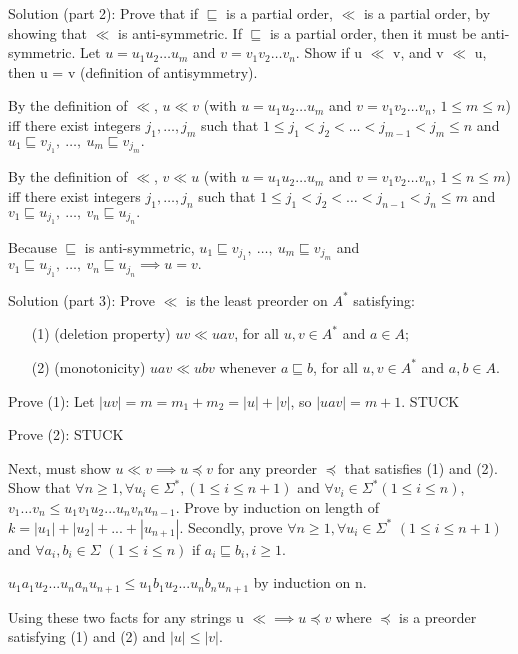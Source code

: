 \documentclass[12pt]{article}
\begin{document}
\medskip
\medskip

Solution (part 2): Prove that if $\sqsubseteq $ is a partial order, $\ll$ is a partial order, by showing that $\ll$ is anti-symmetric. If $\sqsubseteq $ is a
partial order, then it must be anti-symmetric. Let $u=u_{1}u_{2}\ldots u_{m}$ and
$v=v_{1}v_{2}\ldots v_{n}$. Show if u $\ll$ v, and v $\ll$ u, then u = v (definition of antisymmetry).
\medskip

By the definition of $\ll$, $u \ll v$ (with $u=u_{1}u_{2}\ldots u_{m}$ and
$v=v_{1}v_{2}\ldots v_{n}$, $1\leq m\leq n$) iff there exist integers $j_{1},\ldots,j_{m}$ such that
$1\leq j_{1} < j_{2} < \ldots < j_{m-1} < j_{m} \leq n$ and
$u_{1} \sqsubseteq v_{j_{1}},\ \ldots,\ u_{m} \sqsubseteq v_{j_{m}}.$

By the definition of $\ll$, $v \ll u$ (with $u=u_{1}u_{2}\ldots u_{m}$ and
$v=v_{1}v_{2}\ldots v_{n}$, $1\leq n\leq m$) iff there exist integers $j_{1},\ldots,j_{n}$ such that
$1\leq j_{1} < j_{2} < \ldots < j_{n-1} < j_{n} \leq m$ and
$v_{1} \sqsubseteq u_{j_{1}},\ \ldots,\ v_{n} \sqsubseteq u_{j_{n}}.$

\medskip

Because $\sqsubseteq $ is anti-symmetric, $u_{1} \sqsubseteq v_{j_{1}},\ \ldots,\ u_{m} \sqsubseteq v_{j_{m}}$ and
$v_{1} \sqsubseteq u_{j_{1}},\ \ldots,\ v_{n} \sqsubseteq u_{j_{n}} \implies u = v.$


\medskip
\medskip

Solution (part 3): Prove $\ll$ is the least preorder on $A^\ast$ satisfying:
\begin{enumerate}
\item[(1)] (deletion property)
$uv \ll uav$, for all $u, v\in A^{*}$ and $a\in A$;
\medskip
\item[(2)] (monotonicity)
$uav \ll ubv$ whenever $a \sqsubseteq b$, for all $u, v\in A^{*}$ and $a, b\in A$.
\end{enumerate}

Prove (1): Let $|uv| = m = m_1 + m_2 = |u| + |v|$, so $|uav| = m+1$.
STUCK

\medskip

Prove (2): STUCK

Next, must show $u \ll v \implies u \preceq v$ for any preorder $ \preceq $ that satisfies (1) and (2).
Show that $\forall n \ge 1, \forall u_i \in \Sigma^\ast , (1 \le i \le n+1)$ and $ \forall v_i \in \Sigma^\ast (1 \le i \le n)$,
$v_1...v_n \le u_1v_1u_2...u_nv_nu_{n-1}$. Prove by induction on length of $k= |u_1|+|u_2|+ ... +|u_{n+1}|.$ Secondly, prove
$ \forall n \ge 1, \forall u_i \in \Sigma^\ast$ $(1 \le i \le n+1)$ and $\forall a_i,b_i \in \Sigma$ $(1 \le i \le n)$ if $a_i \sqsubseteq b_i, i \ge 1.$

\medskip

$u_1a_1u_2...u_na_nu_{n+1} \le u_1b_1u_2...u_nb_nu_{n+1}$ by induction on n.

\medskip

Using these two facts for any strings u $\ll \implies u \preceq v$ where $\preceq$ is a preorder satisfying (1) and (2) and $|u| \le |v|$.
\end{document}
